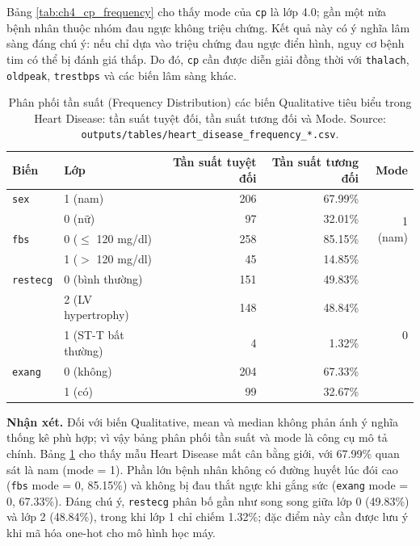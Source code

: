 Bảng \ref{tab:ch4_cp_frequency} cho thấy mode của \texttt{cp} là lớp 4.0; gần một nửa bệnh nhân thuộc nhóm đau ngực không triệu chứng. Kết quả này có ý nghĩa lâm sàng đáng chú ý: nếu chỉ dựa vào triệu chứng đau ngực điển hình, nguy cơ bệnh tim có thể bị đánh giá thấp. Do đó, \texttt{cp} cần được diễn giải đồng thời với \texttt{thalach}, \texttt{oldpeak}, \texttt{trestbps} và các biến lâm sàng khác.

\begin{table}[H]
\centering
\caption[Phân phối tần suất các biến Qualitative Heart Disease]{Phân phối tần suất (Frequency Distribution) các biến Qualitative tiêu biểu trong Heart Disease: tần suất tuyệt đối, tần suất tương đối và Mode. Source: \texttt{outputs/tables/heart\_disease\_frequency\_*.csv}.}
\label{tab:ch4_heart_qualitative_freq}
\scriptsize
\setlength{\tabcolsep}{4pt}
\begin{tabular}{llrrr}
\toprule
Biến & Lớp & Tần suất tuyệt đối & Tần suất tương đối & Mode \\
\midrule
\texttt{sex} & 1 (nam) & 206 & 67.99\% & \multirow{4}{*}{1 (nam)} \\
 & 0 (nữ) & 97 & 32.01\% & \\
\texttt{fbs} & 0 ($\leq$ 120 mg/dl) & 258 & 85.15\% & \multirow{4}{*}{0} \\
 & 1 ($>$ 120 mg/dl) & 45 & 14.85\% & \\
\texttt{restecg} & 0 (bình thường) & 151 & 49.83\% & \multirow{6}{*}{0} \\
 & 2 (LV hypertrophy) & 148 & 48.84\% & \\
 & 1 (ST-T bất thường) & 4 & 1.32\% & \\
\texttt{exang} & 0 (không) & 204 & 67.33\% & \multirow{4}{*}{0} \\
 & 1 (có) & 99 & 32.67\% & \\
\bottomrule
\end{tabular}
\end{table}

\textbf{Nhận xét.} Đối với biến Qualitative, mean và median không phản ánh ý nghĩa thống kê phù hợp; vì vậy bảng phân phối tần suất và mode là công cụ mô tả chính. Bảng \ref{tab:ch4_heart_qualitative_freq} cho thấy mẫu Heart Disease mất cân bằng giới, với 67.99\% quan sát là nam (mode = 1). Phần lớn bệnh nhân không có đường huyết lúc đói cao (\texttt{fbs} mode = 0, 85.15\%) và không bị đau thắt ngực khi gắng sức (\texttt{exang} mode = 0, 67.33\%). Đáng chú ý, \texttt{restecg} phân bố gần như song song giữa lớp 0 (49.83\%) và lớp 2 (48.84\%), trong khi lớp 1 chỉ chiếm 1.32\%; đặc điểm này cần được lưu ý khi mã hóa one-hot cho mô hình học máy.

